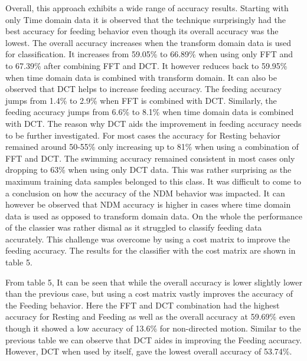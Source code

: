 \documentclass[conference]{IEEEtran}
\begin{document}
Overall, this approach exhibits a wide range of accuracy results. Starting with only Time domain data it is observed that the technique surprisingly had the best accuracy for feeding behavior even though its overall accuracy was the lowest. The overall accuracy increases when the transform domain data is used for classification. It increases from 59.05\% to 66.89\% when using only FFT and to 67.39\% after combining FFT and DCT. It however reduces back to 59.95\% when time domain data is combined with transform domain. It can also be observed that DCT helps to increase feeding accuracy. The feeding accuracy jumps from 1.4\% to 2.9\% when FFT is combined with DCT. Similarly, the feeding accuracy jumps from 6.6\% to 8.1\% when time domain data is combined with DCT. The reason why DCT aids the improvement in feeding accuracy needs to be further investigated. For most cases the accuracy for Resting behavior remained around 50-55\% only increasing up to 81\% when using a combination of FFT and DCT. The swimming accuracy remained consistent in most cases only dropping to 63\% when using only DCT data. This was rather surprising as the maximum training data samples belonged to this class. It was difficult to come to a conclusion on how the accuracy of the NDM behavior was impacted. It can however be observed that NDM accuracy is higher in cases where time domain data is used as opposed to transform domain data. On the whole the performance of the classier was rather dismal as it struggled to classify feeding data accurately. This challenge was overcome by using a cost matrix to improve the feeding accuracy. The results for the classifier with the cost matrix are shown in table 5.


From table 5, It can be seen that while the overall accuracy is lower slightly lower than the previous case, but using a cost matrix vastly improves the accuracy of the Feeding behavior. Here the FFT and DCT combination had the highest accuracy for Resting and Feeding as well as the overall accuracy at 59.69\% even though it showed a low accuracy of 13.6\% for non-directed motion. Similar to the previous table we can observe that DCT aides in improving the Feeding accuracy. However, DCT when used by  itself,  gave the lowest overall accuracy of 53.74\%. 
\end{document}
